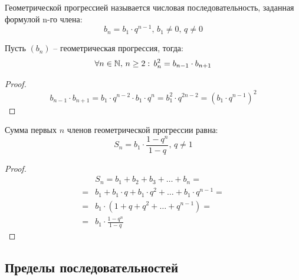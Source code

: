 \documentclass[12pt]{article}
\begin{document}
\begin{definition}
    Геометрической прогрессией называется числовая последовательность, заданная формулой n-го члена:
    $$b_n=b_1 \cdot q^{n-1},\, b_1\neq0,\, q\neq0$$
\end{definition}

\begin{statement}
    Пусть $(b_n)$ -- геометрическая прогрессия, тогда: 
    $$\forall n\in \mathbb{N},\, n\geq 2:\,b_n^2=b_{n-1}\cdot b_{n+1}$$
\end{statement}
\begin{proof}
    $$b_{n-1}\cdot b_{n+1}=b_1\cdot q^{n-2}\cdot b_1 \cdot q^n=b_1^2\cdot q^{2n-2}=(b_1\cdot q^{n-1})^2$$
\end{proof}
\begin{theorem}
    Сумма первых $n$ членов геометрической прогрессии равна:
    $$S_n=b_1\cdot \frac{1-q^n}{1-q},\, q\neq 1$$
\end{theorem}
\begin{proof}
    \begin{align*}
        &S_n=b_1+b_2+b_3+\ldots+b_n=\\
        =&b_1+b_1\cdot q+b_1\cdot q^2+\ldots+b_1\cdot q^{n-1}=\\
        =&b_1\cdot(1+q+q^2+\ldots+q^{n-1})=\\
        =&b_1\cdot \frac{1-q^n}{1-q}
    \end{align*}
\end{proof}

\subsection{Пределы последовательностей}
\end{document}
